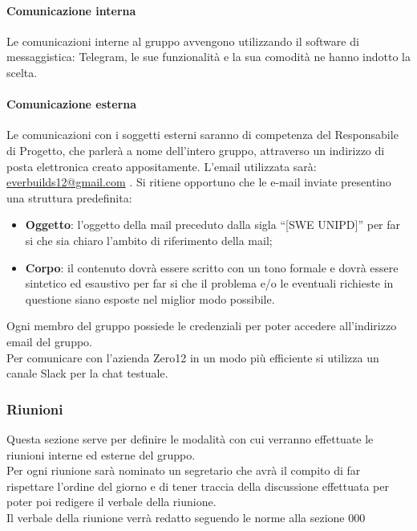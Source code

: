 			\paragraph{Comunicazione interna}
				Le comunicazioni interne al gruppo avvengono utilizzando il software di messaggistica: Telegram, le sue funzionalità e la sua comodità ne hanno indotto la scelta.
			\paragraph{Comunicazione esterna}
				Le comunicazioni con i soggetti esterni saranno di competenza del Responsabile di Progetto, che parlerà a nome dell’intero gruppo, attraverso un indirizzo di posta elettronica creato appositamente. L’email utilizzata sarà: \url{everbuilds12@gmail.com} .
				Si ritiene opportuno che le e-mail inviate presentino una struttura predefinita:
				\begin{itemize}
					\item\textbf{Oggetto}: l’oggetto della mail preceduto dalla sigla “[SWE UNIPD]” per far si che sia chiaro l’ambito di riferimento della mail;
					\item\textbf{Corpo}: il contenuto dovrà essere scritto con un tono formale e dovrà essere sintetico ed esaustivo per far si che il problema e/o le eventuali richieste in questione siano esposte nel miglior modo possibile.
				\end{itemize}
				Ogni membro del gruppo possiede le credenziali per poter accedere all’indirizzo email del gruppo.\\
				Per comunicare con l’azienda Zero12 in un modo più efficiente si utilizza un canale Slack per la chat testuale.
		\subsubsection{Riunioni}
			Questa sezione serve per definire le modalità con cui verranno effettuate le riunioni interne ed esterne del gruppo. \\
			Per ogni riunione sarà nominato un segretario che avrà il compito di far rispettare l’ordine del giorno e di tener traccia della discussione effettuata per poter poi redigere il verbale della riunione.\\
			Il verbale della riunione verrà redatto seguendo le norme alla sezione 000\\
